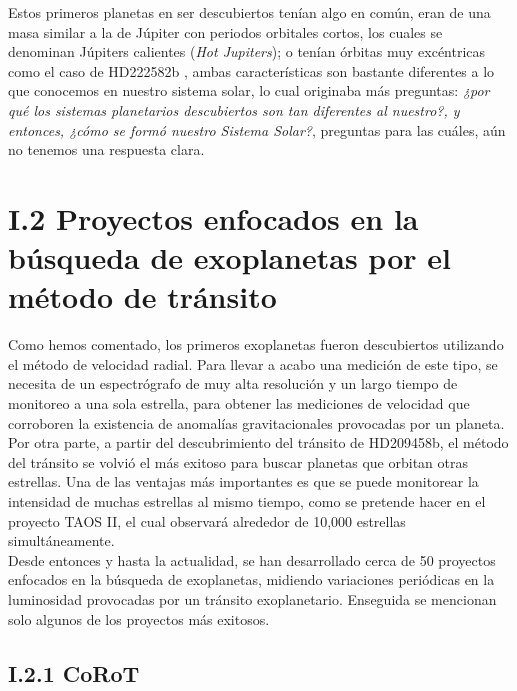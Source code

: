 Estos primeros planetas en ser descubiertos tenían algo en común, eran de una masa similar a la de Júpiter con periodos orbitales cortos, los cuales se denominan Júpiters calientes (\textit{Hot Jupiters}); o tenían órbitas muy excéntricas como el caso de HD222582b \cite{vogt2000six}, ambas características son bastante diferentes a lo que conocemos en nuestro sistema solar, lo cual originaba más preguntas: \textit{¿por qué los sistemas planetarios descubiertos son tan diferentes al nuestro?, y entonces, ¿cómo se formó nuestro Sistema Solar?}, preguntas para las cuáles, aún no tenemos una respuesta clara.\\ 

\section*{I.2 Proyectos enfocados en la búsqueda de exoplanetas por el método de tránsito}

Como hemos comentado, los primeros exoplanetas fueron descubiertos utilizando el método de velocidad radial. Para llevar a acabo una medición de este tipo, se necesita de un espectrógrafo de muy alta resolución y un largo tiempo de monitoreo a una sola estrella, para obtener las mediciones de velocidad que corroboren la existencia de anomalías gravitacionales provocadas por un planeta. Por otra parte, a partir del descubrimiento del tránsito de HD209458b, el método del tránsito se volvió el más exitoso para buscar planetas que orbitan otras estrellas. Una de las ventajas más importantes es que se puede monitorear la intensidad de muchas estrellas al mismo tiempo, como se pretende hacer en el proyecto TAOS II, el cual observará alrededor de 10,000 estrellas simultáneamente.\\

Desde entonces y hasta la actualidad, se han desarrollado cerca de 50 proyectos enfocados en la búsqueda de exoplanetas, midiendo variaciones periódicas en la luminosidad provocadas por un tránsito exoplanetario. Enseguida se mencionan solo algunos de los proyectos más exitosos.\\



\subsection*{I.2.1 CoRoT}

